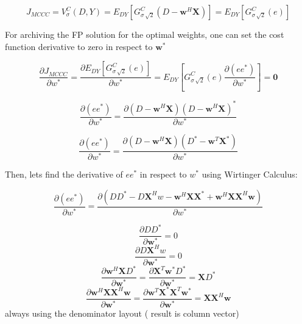 \documentclass[preprint,12pt]{elsarticle}
\begin{document}
\begin{equation}\nonumber
J_{MCCC} = V^{C}_{\sigma}(D, Y) = E_{DY}[G^{C}_{\sigma\,\sqrt{2}}(D-\textbf{w}^{H}\textbf{X})] =  E_{DY}[G^{C}_{\sigma\,\sqrt{2}}(e)]
\end{equation}

For archiving the FP solution for the optimal weights, one can set the cost function derivative to zero in respect to $\textbf{w}^*$ 

\begin{equation}\nonumber
\frac{\partial J_{MCCC} }{\partial w^{*}} = \frac{\partial E_{DY}[G^{C}_{\sigma\,\sqrt{2}}(e)] }{\partial w^{*}}  = E_{DY} \left [ G^{C}_{\sigma\,\sqrt{2}}(e)\frac{\partial (ee^*) }{\partial w^{*}} \right ]   =  \textbf{0}
\end{equation}

\begin{equation}\nonumber
\frac{\partial (ee^*)}{\partial w^*} = \frac{\partial (D-\textbf{w}^{H}\textbf{X})(D-\textbf{w}^{H}\textbf{X})^* }{\partial w^*}
\end{equation}

\begin{equation}\nonumber
\frac{\partial (ee^*)}{\partial w^*} = \frac{\partial (D-\textbf{w}^{H}\textbf{X})(D^*-\textbf{w}^{T}\textbf{X}^*) }{\partial w^*}
\end{equation}

Then, lets find the derivative of $ee^*$ in respect to $w^{*}$ using Wirtinger Calculus:

\begin{equation}\nonumber
\frac{\partial (ee^*)}{\partial w^*} = \frac{\partial (DD^* - D\textbf{X}^{H}w - \textbf{w}^{H}\textbf{XX}^{*} + \textbf{w}^{H}\textbf{XX}^{H}\textbf{w} ) }{\partial w^{*}}
\end{equation}

\begin{equation}\nonumber
\frac{\partial DD^* }{\partial \textbf{w}^*} = 0
\end{equation}
\begin{equation}\nonumber
\frac{\partial D\textbf{X}^{H}w }{\partial \textbf{w}^*} = 0
\end{equation}
\begin{equation}\nonumber
\frac{\partial \textbf{w}^{H}\textbf{X}D^{*} }{\partial \textbf{w}^*} = \frac{\partial \textbf{X}^T \textbf{w}^*D^{*} }{\partial \textbf{w}^*} = \textbf{X}D^*
\end{equation}
\begin{equation}\nonumber
\frac{\partial \textbf{w}^{H}\textbf{XX}^{H}\textbf{w} }{\partial \textbf{w}^*} = \frac{\partial \textbf{w}^T \textbf{X}^* \textbf{X}^T \textbf{w}^*  }{\partial \textbf{w}^*} = \textbf{X}\textbf{X}^H \textbf{w}
\end{equation}
always using the denominator layout ( result is column vector) 
\end{document}
